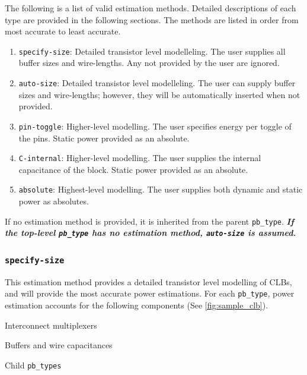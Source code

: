 \documentclass[letterpaper,twoside,10pt]{article}
\begin{document}
The following is a list of valid estimation methods. Detailed descriptions of each type are provided in the following sections.  The methods are listed in order from most accurate to least accurate. 
\begin{enumerate}
\item \texttt{specify-size}: Detailed transistor level modelleling. The user supplies all buffer sizes and wire-lengths.  Any not provided by the user are ignored. 
\item \texttt{auto-size}: Detailed transistor level modelleling. The user can supply buffer sizes and wire-lengths; however, they will be automatically inserted when not provided. 
\item \texttt{pin-toggle}: Higher-level modelling.  The user specifies energy per toggle of the pins.  Static power provided as an absolute.
\item \texttt{C-internal}: Higher-level modelling.  The user supplies the internal capacitance of the block.  Static power provided as an absolute.
\item \texttt{absolute}: Highest-level modelling.  The user supplies both dynamic and static power as absolutes.
\end{enumerate}

If no estimation method is provided, it is inherited from the parent \texttt{pb\_type}. \textit{\textbf{If the top-level \texttt{pb\_type} has no estimation method, \texttt{auto-size} is assumed.}}  

\subsubsection{\texttt{specify-size}}
This estimation method provides a detailed transistor level modelling of CLBs, and will provide the most accurate power estimations.  For each \texttt{pb\_type}, power estimation accounts for the following components (See \autoref{fig:sample_clb}).
\begin{itemize*}
	\item Interconnect multiplexers
	\item Buffers and wire capacitances
	\item Child \texttt{pb\_types}
\end{itemize*}
\end{document}
